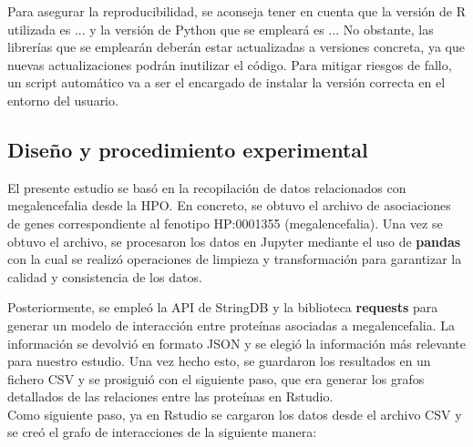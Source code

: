 
Para asegurar la reproducibilidad, se aconseja tener en cuenta que la versión de R utilizada es ... y la versión de Python que se empleará es ... No obstante, las librerías que se emplearán deberán estar actualizadas a versiones concreta, ya que nuevas actualizaciones podrán inutilizar el código. Para mitigar riesgos de fallo, un script automático va a ser el encargado de instalar la versión correcta en el entorno del usuario.

\subsection{Diseño y procedimiento experimental}
El presente estudio se basó en la recopilación de datos relacionados con megalencefalia desde la HPO. En concreto, se obtuvo el archivo de asociaciones de genes correspondiente al fenotipo HP:0001355 (megalencefalia). Una vez se obtuvo el archivo, se procesaron los datos en Jupyter mediante el uso de \textbf{pandas} con la cual se realizó operaciones de limpieza y transformación para garantizar la calidad y consistencia de los datos. 

Posteriormente, se empleó la API de StringDB y la biblioteca \textbf{requests} para generar un modelo de interacción entre proteínas asociadas a megalencefalia. La información se devolvió en formato JSON y se elegió la información más relevante para nuestro estudio. Una vez hecho esto, se guardaron los resultados en un fichero CSV y se prosiguió con el siguiente paso, que era generar los grafos detallados de las relaciones entre las proteínas en Rstudio. \\

Como siguiente paso, ya en Rstudio se cargaron los datos desde el archivo CSV y se creó el grafo de interacciones de la siguiente manera:

